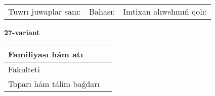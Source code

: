 \documentclass{article}
\begin{document}
\vspace{1cm}

\begin{tabular}{lll}
Tuwrı juwaplar sanı: \underline{\hspace{1.5cm}} & 
Bahası: \underline{\hspace{1.5cm}} & 
Imtixan alıwshınıń qolı: \underline{\hspace{2cm}} \\
\end{tabular}

\egroup

\newpage


\textbf{27-variant}\\

\bgroup
\def\arraystretch{1.6} %

\begin{tabular}{|m{5.7cm}|m{9.5cm}|}
\hline
Familiyası hám atı & \\
\hline
Fakulteti  & \\
\hline
Toparı hám tálim baǵdarı  & \\
\hline
\end{tabular}

\vspace{1cm}
\end{document}
